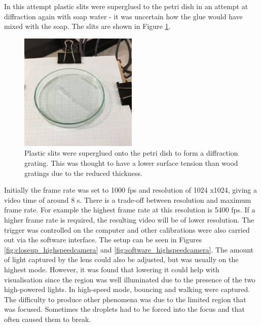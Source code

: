 In this attempt plastic slits were superglued to the petri dish in an attempt at diffraction again with soap water - it was uncertain how the glue would have mixed with the soap. The slits are shown in Figure \ref{fig:plastic_slits}.

\begin{figure}[htb]
\includegraphics[width=0.5\textwidth]{prototype/exp_rep_imgs/plastic_slits.jpg}
\centering
\caption{Plastic slits were superglued onto the petri dish to form a diffraction grating. This was thought to have a lower surface tension than wood gratings due to the reduced thickness.}
\centering
\label{fig:plastic_slits}
\end{figure}

Initially the frame rate was set to 1000 fps and resolution of 1024 x1024, giving a video time of around 8 s. There is a trade-off between resolution and maximum frame rate. For example the highest frame rate at this resolution is 5400 fps. If a higher frame rate is required, the resulting video will be of lower resolution. The trigger was controlled on the computer and other calibrations were also carried out via the software interface. The setup can be seen in Figures \ref{fig:closeup_highspeedcamera} and \ref{fig:software_highspeedcamera}. The amount of light captured by the lens could also be adjusted, but was usually on the highest mode. However, it was found that lowering it could help with visualisation since the region was well illuminated due to the presence of the two high-powered lights. In high-speed mode, bouncing and walking were captured. The difficulty to produce other phenomena was due to the limited region that was focused. Sometimes the droplets had to be forced into the focus and that often caused them to break.

